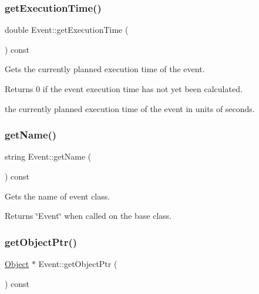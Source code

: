 \subsubsection{\texorpdfstring{get\+Execution\+Time()}{getExecutionTime()}}
{\footnotesize\ttfamily double Event\+::get\+Execution\+Time (\begin{DoxyParamCaption}{ }\end{DoxyParamCaption}) const}



Gets the currently planned execution time of the event. 

\begin{DoxyReturn}{Returns}
0 if the event execution time has not yet been calculated. 

the currently planned execution time of the event in units of seconds. 
\end{DoxyReturn}
\mbox{\label{class_event_a8c38a406d844d05eac1ef007bad2487f}} 
\subsubsection{\texorpdfstring{get\+Name()}{getName()}}
{\footnotesize\ttfamily string Event\+::get\+Name (\begin{DoxyParamCaption}{ }\end{DoxyParamCaption}) const\hspace{0.3cm}{\ttfamily [virtual]}}



Gets the name of event class. 

\begin{DoxyReturn}{Returns}
\char`\"{}\+Event\char`\"{} when called on the base class. 
\end{DoxyReturn}
\mbox{\label{class_event_a5317d42bb07d0e75bec0c13bd9bf6de8}} 
\subsubsection{\texorpdfstring{get\+Object\+Ptr()}{getObjectPtr()}}
{\footnotesize\ttfamily \hyperlink{class_object}{Object} $\ast$ Event\+::get\+Object\+Ptr (\begin{DoxyParamCaption}{ }\end{DoxyParamCaption}) const}



